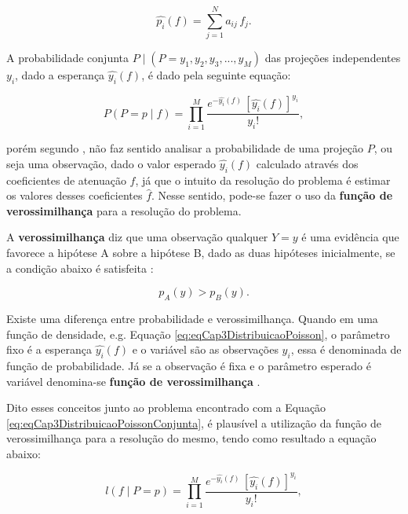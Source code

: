 {{\begin{equation}
\hat{p_{i}}(f) = \sum_{j=1}^{N} a_{ij} \, f_{j}.
\label{eq:eqCap3BeerEsperancaAtenuacao}
\end{equation}

A probabilidade conjunta $P \mid (P = {y_{1},y_{2},y_{3},...,y_{M}})$ das projeções independentes $y_{i}$, dado a esperança $\hat{y_{i}}(f)$, é dado pela seguinte equação:   

\begin{equation}
P(P = p\mid f ) = \prod_{i=1}^{M}  \dfrac{e^{-\hat{y_{i}}(f)} \, [\hat{y_{i}}(f)]^{y_{i}}}  {y_{i}!},
\label{eq:eqCap3DistribuicaoPoissonConjunta}
\end{equation}

\noindent porém segundo , não faz sentido analisar a probabilidade de uma projeção $P$, ou seja uma observação, dado o valor esperado $\hat{y_{i}}(f)$ calculado através dos coeficientes de atenuação $f$, já que o intuito da resolução do problema é estimar os valores desses coeficientes $\hat{f}$. Nesse sentido, pode-se fazer o uso da \textbf{função de verossimilhança} para a resolução do problema.

A \textbf{verossimilhança} diz que uma observação qualquer $Y = y$ é uma evidência que favorece a hipótese A sobre a hipótese B, dado as duas hipóteses inicialmente, se a condição abaixo é satisfeita \cite{morettin2010}:

\begin{equation}
p_{A}(y) >p_{B}(y).
\label{eq:eqCap3LeiVerossimilhanca}
\end{equation}

Existe uma diferença entre probabilidade e verossimilhança. Quando em uma função de densidade, e.g. Equação \ref{eq:eqCap3DistribuicaoPoisson}, o parâmetro fixo é a esperança $\hat{y_{i}}(f)$ e o variável são as observações $y_{i}$, essa é denominada de função de probabilidade. Já se a observação é fixa e o parâmetro esperado é variável denomina-se \textbf{função de verossimilhança} \cite{morettin2010}.

Dito esses conceitos junto ao problema encontrado com a Equação \ref{eq:eqCap3DistribuicaoPoissonConjunta}, é plausível a utilização da função de verossimilhança para a resolução do mesmo, tendo como resultado a equação abaixo: 

\begin{equation}
l(f \mid P = p) = \prod_{i=1}^{M}  \dfrac{e^{-\hat{y_{i}}(f)} \, [\hat{y_{i}}(f)]^{y_{i}}}  {y_{i}!},
\label{eq:eqCap3DistribuicaoPoissonConjuntaVerossimilhanca1}
\end{equation} 
  
}}
